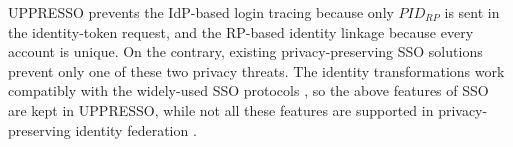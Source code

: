 UPPRESSO prevents the IdP-based login tracing because only $PID_{RP}$ is sent in the identity-token request,
    and the RP-based identity linkage because every account is unique.
On the contrary,
     existing privacy-preserving SSO solutions \cite{BrowserID,SPRESSO,NIST2017draft,FirefoxAccount} prevent only one of these two privacy threats.
The identity transformations work compatibly with
    the widely-used SSO protocols \cite{OpenIDConnect,rfc6749,SAML,NIST2017draft},
    so the above features of SSO are kept in UPPRESSO,
    while not all these features are supported in privacy-preserving identity federation \cite{PseudoID,ELPASSO,UnlimitID,Opaak,uprov,hyperledge-idemix}.
%
%
